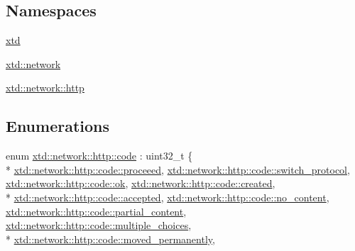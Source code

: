 \subsection*{Namespaces}
\begin{DoxyCompactItemize}
\item 
 \hyperlink{namespacextd}{xtd}
\item 
 \hyperlink{namespacextd_1_1network}{xtd\+::network}
\item 
 \hyperlink{namespacextd_1_1network_1_1http}{xtd\+::network\+::http}
\end{DoxyCompactItemize}
\subsection*{Enumerations}
\begin{DoxyCompactItemize}
\item 
enum \hyperlink{namespacextd_1_1network_1_1http_a55148922a7d13fe756e53e2ccad4b89c}{xtd\+::network\+::http\+::code} \+: uint32\+\_\+t \{ \\*
\hyperlink{namespacextd_1_1network_1_1http_a55148922a7d13fe756e53e2ccad4b89cab41e384919d3fded84fe2803c82af70f}{xtd\+::network\+::http\+::code\+::proceeed}, 
\hyperlink{namespacextd_1_1network_1_1http_a55148922a7d13fe756e53e2ccad4b89ca95e78c491edb90cfdcd3ff95e4700d46}{xtd\+::network\+::http\+::code\+::switch\+\_\+protocol}, 
\hyperlink{namespacextd_1_1network_1_1http_a55148922a7d13fe756e53e2ccad4b89ca444bcb3a3fcf8389296c49467f27e1d6}{xtd\+::network\+::http\+::code\+::ok}, 
\hyperlink{namespacextd_1_1network_1_1http_a55148922a7d13fe756e53e2ccad4b89cae2fa538867c3830a859a5b17ab24644b}{xtd\+::network\+::http\+::code\+::created}, 
\\*
\hyperlink{namespacextd_1_1network_1_1http_a55148922a7d13fe756e53e2ccad4b89ca3e4d891a5df3d6d0d7dd9432a1bc6470}{xtd\+::network\+::http\+::code\+::accepted}, 
\hyperlink{namespacextd_1_1network_1_1http_a55148922a7d13fe756e53e2ccad4b89ca7d1e27253ac06e307e599edb2b0558bd}{xtd\+::network\+::http\+::code\+::no\+\_\+content}, 
\hyperlink{namespacextd_1_1network_1_1http_a55148922a7d13fe756e53e2ccad4b89cae5e1e80aaecf3acf426c699f9e298164}{xtd\+::network\+::http\+::code\+::partial\+\_\+content}, 
\hyperlink{namespacextd_1_1network_1_1http_a55148922a7d13fe756e53e2ccad4b89ca9aeba7eb915334acd922761566c2ac86}{xtd\+::network\+::http\+::code\+::multiple\+\_\+choices}, 
\\*
\hyperlink{namespacextd_1_1network_1_1http_a55148922a7d13fe756e53e2ccad4b89ca522c7a01a5f0022064cc90149c179fa7}{xtd\+::network\+::http\+::code\+::moved\+\_\+permanently}, 

\end{DoxyCompactItemize}
